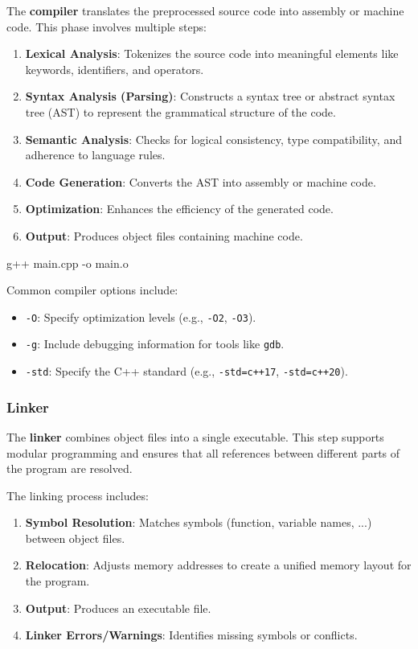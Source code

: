     The \textbf{compiler} translates the preprocessed source code into assembly or machine code. This phase involves multiple steps:
    \begin{enumerate}
        \item \textbf{Lexical Analysis}: Tokenizes the source code into meaningful elements like keywords, identifiers, and operators.
        \item \textbf{Syntax Analysis (Parsing)}: Constructs a syntax tree or abstract syntax tree (AST) to represent the grammatical structure of the code.
        \item \textbf{Semantic Analysis}: Checks for logical consistency, type compatibility, and adherence to language rules.
        \item \textbf{Code Generation}: Converts the AST into assembly or machine code.
        \item \textbf{Optimization}: Enhances the efficiency of the generated code.
        \item \textbf{Output}: Produces object files containing machine code.
    \end{enumerate}
    
    \begin{codeblock}[language=bash, numbers=none]
g++ main.cpp -o main.o
    \end{codeblock}
    
    Common compiler options include:
    \begin{itemize}
        \item \texttt{-O}: Specify optimization levels (e.g., \texttt{-O2}, \texttt{-O3}).
        \item \texttt{-g}: Include debugging information for tools like \texttt{gdb}.
        \item \texttt{-std}: Specify the C++ standard (e.g., \texttt{-std=c++17}, \texttt{-std=c++20}).
    \end{itemize}

\subsubsection{Linker}
    
    The \textbf{linker} combines object files into a single executable. This step supports modular programming and ensures that all references between different parts of the program are resolved.
    
    The linking process includes:
    \begin{enumerate}
        \item \textbf{Symbol Resolution}: Matches symbols (function, variable names, ...) between object files.
        \item \textbf{Relocation}: Adjusts memory addresses to create a unified memory layout for the program.
        \item \textbf{Output}: Produces an executable file.
        \item \textbf{Linker Errors/Warnings}: Identifies missing symbols or conflicts.
    \end{enumerate}
    
